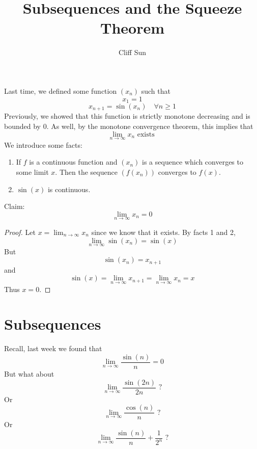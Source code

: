 \documentclass{article}
\title{Subsequences and the Squeeze Theorem}
\author{Cliff Sun}
\newtheorem{one minute paper}[theorem]{One Minute Paper}
\begin{document}
\maketitle

Last time, we defined some function $(x_n)$ such that 
\begin{equation}
    x_1 = 1
\end{equation} 
\begin{equation}
    x_{n+1} = \sin(x_n) \quad \forall n \geq 1
\end{equation}
Previously, we showed that this function is strictly monotone decreasing and is bounded by 0. As well, by the monotone convergence theorem, 
this implies that
\begin{equation}
    \lim_{n\rightarrow\infty}x_n \textrm{ exists }
\end{equation}
We introduce some facts:
\begin{enumerate}
    \item If $f$ is a continuous function and $(x_n)$ is a sequence which converges to some limit $x$. Then the sequence $(f(x_n))$ converges to $f(x)$. 
    \item $\sin(x)$ is continuous.  
\end{enumerate}

Claim:
\begin{equation}
    \lim_{n\rightarrow\infty}x_n = 0
\end{equation}

\begin{proof}
    Let $x = \lim_{n\rightarrow\infty}x_n$ since we know that it exists. By facts 1 and 2, 
    \begin{equation}
        \lim_{n\rightarrow\infty}\sin(x_n) = \sin(x)
    \end{equation}
    But
    \begin{equation}
        \sin(x_n) = x_{n+1}
    \end{equation}
    and
    \begin{equation}
        \sin(x) = \lim_{n\rightarrow\infty}x_{n+1} = \lim_{n\rightarrow\infty}x_{n} = x
    \end{equation}
    Thus $x = 0$. 
\end{proof}

\section*{Subsequences}

Recall, last week we found that 
\begin{equation}
    \lim_{n\rightarrow\infty}\frac{\sin(n)}{n} = 0
\end{equation}
But what about
\begin{equation}
    \lim_{n\rightarrow\infty}\frac{\sin(2n)}{2n} \textrm{ ?}
\end{equation}
Or
\begin{equation}
    \lim_{n\rightarrow\infty}\frac{\cos(n)}{n} \textrm{ ?}
\end{equation}
Or
\begin{equation}
    \lim_{n\rightarrow\infty}\frac{\sin(n)}{n} + \frac{1}{2^n} \textrm{ ?}
\end{equation}
\end{document}
